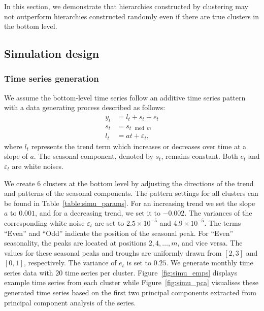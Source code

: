 \documentclass[a4paper,review,12pt,authoryear]{elsarticle}
\begin{document}
In this section, we demonstrate that hierarchies constructed by clustering may not outperform hierarchies constructed randomly even if there are true clusters in the bottom level.

\subsection{Simulation design}

\subsubsection*{Time series generation}

We assume the bottom-level time series follow an additive time series pattern with a data generating process described as follows:
\begin{equation}
    \label{simu:DGP}
    \begin{aligned}
    y_t &= l_t + s_t + e_t \\
    s_t &= s_{t\mod m} \\
    l_t &= a t + \varepsilon_t,
    \end{aligned}
\end{equation}
where $l_t$ represents the trend term which increases or decreases over time at a slope of $a$. The seasonal component, denoted by $s_t$, remains constant. Both $e_t$ and $\varepsilon_t$ are white noises.

We create $6$ clusters at the bottom level by adjusting the directions of the trend and patterns of the seasonal components.
The pattern settings for all clusters can be found in Table~\ref{table:simu_params}. For an increasing trend we set the slope $a$ to $0.001$, and for a decreasing trend, we set it to $-0.002$. The variances of the corresponding white noise $\varepsilon_t$ are set to $2.5\times 10^{-5}$ and $4.9\times 10^{-5}$. The terms ``Even'' and ``Odd'' indicate the position of the seasonal peak. For ``Even'' seasonality, the peaks are located at positions $2, 4, \dots, m$, and vice versa. The values for these seasonal peaks and troughs are uniformly drawn from $[2, 3]$ and $[0,1]$, respectively. The variance of $e_t$ is set to $0.25$. We generate monthly time series data with $20$ time series per cluster. Figure~\ref{fig:simu_emps} displays example time series from each cluster while Figure~\ref{fig:simu_pca} visualises these generated time series based on the first two principal components extracted from principal component analysis of the series.
\end{document}
